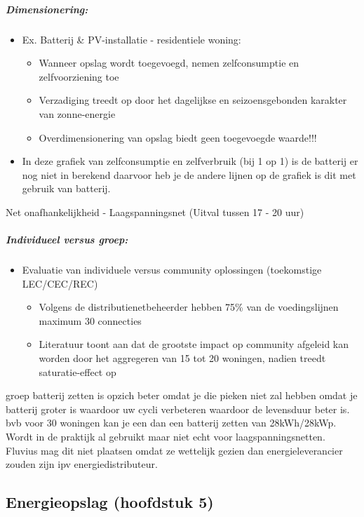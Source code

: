 \documentclass[12pt]{article}
\begin{document}
\subparagraph{Dimensionering:}
\begin{itemize}
    \item Ex. Batterij \& PV-installatie - residentiele woning:\begin{itemize}
        \item Wanneer opslag wordt toegevoegd, nemen zelfconsumptie en zelfvoorziening toe
        \item Verzadiging treedt op door het dagelijkse en seizoensgebonden karakter van zonne-energie
        \item Overdimensionering van opslag biedt geen toegevoegde waarde!!!
    \end{itemize}
    \item[] In deze grafiek van zelfconsumptie en zelfverbruik (bij 1 op 1) is de batterij er nog niet in berekend daarvoor heb je de andere lijnen op de grafiek is dit met gebruik van batterij.
\end{itemize}
Net onafhankelijkheid - Laagspanningsnet (Uitval tussen 17 - 20 uur)
\subparagraph{Individueel versus groep:}
\begin{itemize}
    \item Evaluatie van individuele versus community oplossingen (toekomstige LEC/CEC/REC)\begin{itemize}
        \item Volgens de distributienetbeheerder hebben 75\% van de voedingslijnen maximum 30 connecties
        \item Literatuur toont aan dat de grootste impact op community afgeleid kan worden door het aggregeren van 15 tot 20 woningen, nadien treedt saturatie-effect op
    \end{itemize}
\end{itemize}
groep batterij zetten is opzich beter omdat je die pieken niet zal hebben omdat je batterij groter is waardoor uw cycli verbeteren waardoor de levensduur beter is. bvb voor 30 woningen kan je een dan een batterij zetten van 28kWh/28kWp. Wordt in de praktijk al gebruikt maar niet echt voor laagspanningsnetten. Fluvius mag dit niet plaatsen omdat ze wettelijk gezien dan energieleverancier zouden zijn ipv energiedistributeur.
\subsection{Energieopslag (hoofdstuk 5)}
\end{document}
